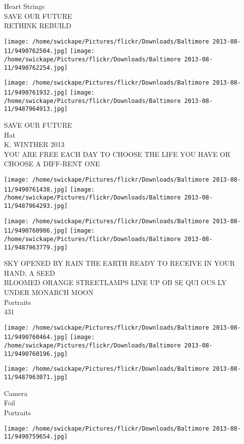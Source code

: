 \documentclass[10pt,letterpaper]{article}
\begin{document}
Heart Strings\\
SAVE OUR FUTURE\\
RETHINK REBUILD
\pagebreak

\texttt{[image: /home/swickape/Pictures/flickr/Downloads/Baltimore 2013-08-11/9490762504.jpg]}
\texttt{[image: /home/swickape/Pictures/flickr/Downloads/Baltimore 2013-08-11/9490762254.jpg]}

\texttt{[image: /home/swickape/Pictures/flickr/Downloads/Baltimore 2013-08-11/9490761932.jpg]}
\texttt{[image: /home/swickape/Pictures/flickr/Downloads/Baltimore 2013-08-11/9487964913.jpg]}

SAVE OUR FUTURE\\
Hat\\
K. WINTHER 2013\\
YOU ARE FREE EACH DAY TO CHOOSE THE LIFE YOU HAVE OR CHOOSE A DIFF{-}RENT ONE
\pagebreak

\texttt{[image: /home/swickape/Pictures/flickr/Downloads/Baltimore 2013-08-11/9490761438.jpg]}
\texttt{[image: /home/swickape/Pictures/flickr/Downloads/Baltimore 2013-08-11/9487964293.jpg]}

\texttt{[image: /home/swickape/Pictures/flickr/Downloads/Baltimore 2013-08-11/9490760906.jpg]}
\texttt{[image: /home/swickape/Pictures/flickr/Downloads/Baltimore 2013-08-11/9487963779.jpg]}

SKY OPENED BY RAIN THE EARTH READY TO RECEIVE IN YOUR HAND, A SEED\\
BLOOMED ORANGE STREETLAMPS LINE UP OB SE QUI OUS LY UNDER MONARCH MOON\\
Portraits\\
431
\pagebreak

\texttt{[image: /home/swickape/Pictures/flickr/Downloads/Baltimore 2013-08-11/9490760464.jpg]}
\texttt{[image: /home/swickape/Pictures/flickr/Downloads/Baltimore 2013-08-11/9490760196.jpg]}

\vspace{0.25in}
\texttt{[image: /home/swickape/Pictures/flickr/Downloads/Baltimore 2013-08-11/9487963071.jpg]}

Camera\\
Foil\\
Portraits
\pagebreak

\texttt{[image: /home/swickape/Pictures/flickr/Downloads/Baltimore 2013-08-11/9490759654.jpg]}
\end{document}
